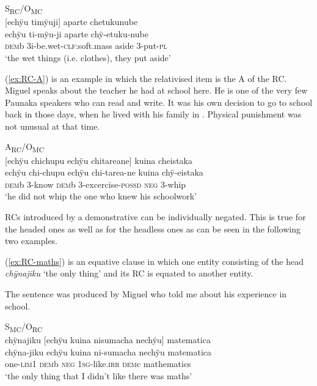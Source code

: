 \ea\label{ex:RC-CLF}
\begingl
\glpreamble \textup{S\textsubscript{RC}/O\textsubscript{MC}}\\\textup{[}echÿu timÿuji\textup{]} aparte chetukunube\\
\gla echÿu ti-mÿu-ji aparte chÿ-etuku-nube\\
\glb \textsc{dem}b 3i-be.wet-\textsc{clf:}soft.mass aside 3-put-\textsc{pl}\\
\glft ‘the wet things (i.e. clothes), they put aside’
\endgl
\trailingcitation{[jxx-p151016l-2.132]}
\xe


(\ref{ex:RC-A}) is an example in which the relativised item is the A of the RC. Miguel speaks about the teacher he had at school here. He is one of the very few Paunaka speakers who can read and write. It was his own decision to go to school back in those days, when he lived with his family in . Physical punishment was not unusual at that time. 

\ea\label{ex:RC-A}
\begingl
\glpreamble \textup{A\textsubscript{RC}/O\textsubscript{MC}}\\\textup{[}echÿu chichupu echÿu chitareane\textup{]} kuina cheistaka\\
\gla echÿu chi-chupu echÿu chi-tarea-ne kuina chÿ-eistaka\\
\glb \textsc{dem}b 3-know \textsc{dem}b 3-excercise-\textsc{possd} \textsc{neg} 3-whip\\
\glft ‘he did not whip the one who knew his schoolwork’
\endgl
\trailingcitation{[mxx-p181027l-1.076]}
\xe

RCs introduced by a demonstrative can be individually negated. This is true for the headed ones as well as for the headless ones as can be seen in the following two examples.

(\ref{ex:RC-maths}) is an equative clause in which one entity consisting of the head \textit{chÿnajiku} ‘the only thing’ and its RC is equated to another entity.

The sentence was produced by Miguel who told me about his experience in school.

\ea\label{ex:RC-maths}
\begingl
\glpreamble \textup{S\textsubscript{MC}/O\textsubscript{RC}}\\chÿnajiku \textup{[}echÿu kuina nisumacha nechÿu\textup{]} matematica\\
\gla chÿna-jiku echÿu kuina ni-sumacha nechÿu matematica\\
\glb one-\textsc{lim}1 \textsc{dem}b \textsc{neg} 1\textsc{sg}-like.\textsc{irr} \textsc{dem}c mathematics\\
\glft ‘the only thing that I didn’t like there was maths’
\endgl
\trailingcitation{[mxx-p181027l-1.090]}
\xe

